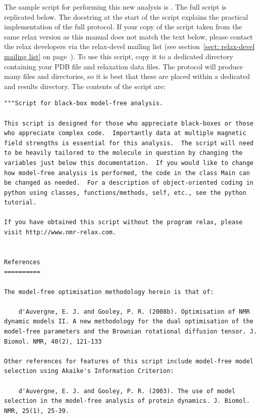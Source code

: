 \begin{htmlonly}
\begin{htmlonly}
The sample script for performing this new analysis is .
The full script is replicated below.
The docstring at the start of the script explains the practical implementation of the full protocol.
If your copy of the  script taken from the same relax version as this manual does not match the text below, please contact the relax developers via the relax-devel mailing list (see section~\ref{sect: relax-devel mailing list} on page~\pageref{sect: relax-devel mailing list}).
To use this script, copy it to a dedicated directory containing your PDB file and relaxation data files.
The protocol will produce many files and directories, so it is best that these are placed within a dedicated and results directory.
The contents of the script are:

\begin{lstlisting}
"""Script for black-box model-free analysis.

This script is designed for those who appreciate black-boxes or those who appreciate complex code.  Importantly data at multiple magnetic field strengths is essential for this analysis.  The script will need to be heavily tailored to the molecule in question by changing the variables just below this documentation.  If you would like to change how model-free analysis is performed, the code in the class Main can be changed as needed.  For a description of object-oriented coding in python using classes, functions/methods, self, etc., see the python tutorial.

If you have obtained this script without the program relax, please visit http://www.nmr-relax.com.


References
==========

The model-free optimisation methodology herein is that of:

    d'Auvergne, E. J. and Gooley, P. R. (2008b). Optimisation of NMR dynamic models II. A new methodology for the dual optimisation of the model-free parameters and the Brownian rotational diffusion tensor. J. Biomol. NMR, 40(2), 121-133

Other references for features of this script include model-free model selection using Akaike's Information Criterion:

    d'Auvergne, E. J. and Gooley, P. R. (2003). The use of model selection in the model-free analysis of protein dynamics. J. Biomol. NMR, 25(1), 25-39.


\end{lstlisting}
\end{htmlonly}
\end{htmlonly}
